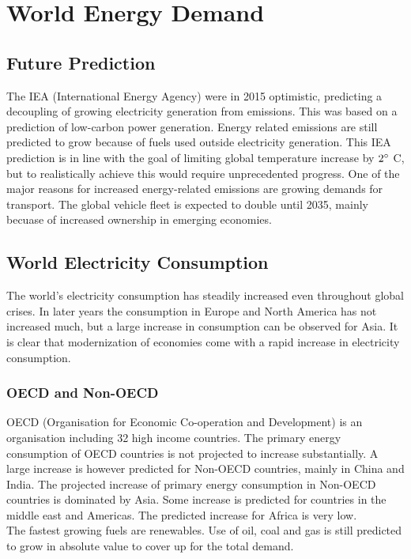 \section{World Energy Demand}

\subsection{Future Prediction}
The IEA (International Energy Agency) were in 2015 optimistic, predicting a decoupling of growing electricity generation from \cotwo emissions.
This was based on a prediction of low-carbon power generation.
Energy related \cotwo emissions are still predicted to grow because of fuels used outside electricity generation.
This IEA prediction is in line with the goal of limiting global temperature increase by $2\degree$ C, but to realistically achieve this would require unprecedented progress.
One of the major reasons for increased energy-related \cotwo emissions are growing demands for transport.
The global vehicle fleet is expected to double until 2035, mainly becuase of increased ownership in emerging economies.

\subsection{World Electricity Consumption}
The world's electricity consumption has steadily increased even throughout global crises.
In later years the consumption in Europe and North America has not increased much, but a large increase in consumption can be observed for Asia.
It is clear that modernization of economies come with a rapid increase in electricity consumption.

\subsubsection{OECD and Non-OECD}
OECD (Organisation for Economic Co-operation and Development) is an organisation including 32 high income countries.
The primary energy consumption of OECD countries is not projected to increase substantially.
A large increase is however predicted for Non-OECD countries, mainly in China and India.
The projected increase of primary energy consumption in Non-OECD countries is dominated by Asia.
Some increase is predicted for countries in the middle east and Americas.
The predicted increase for Africa is very low.\\

The fastest growing fuels are renewables.
Use of oil, coal and gas is still predicted to grow in absolute value to cover up for the total demand.

